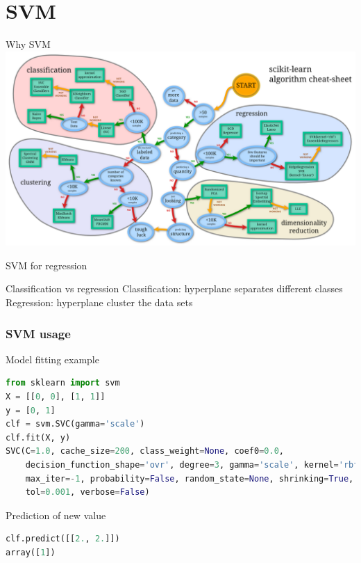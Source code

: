 \section{SVM}
\begin{frame}{Why SVM}
\centering
\includegraphics[height=0.8\textheight]{../figures/ml_cheatsheet.png}
\end{frame}

\begin{frame}{SVM for regression}
\begin{block}{Classification vs regression}
Classification: hyperplane separates different classes\\
Regression: hyperplane cluster the data sets
\end{block}
\end{frame}

\begin{frame}[fragile]
\frametitle{SVM usage}
\begin{block}{Model fitting example}
\begin{lstlisting}[language={python},frame=single]
from sklearn import svm
X = [[0, 0], [1, 1]]
y = [0, 1]
clf = svm.SVC(gamma='scale')
clf.fit(X, y)  
SVC(C=1.0, cache_size=200, class_weight=None, coef0=0.0,
    decision_function_shape='ovr', degree=3, gamma='scale', kernel='rbf',
    max_iter=-1, probability=False, random_state=None, shrinking=True,
    tol=0.001, verbose=False)
\end{lstlisting}
\end{block}
\begin{block}{Prediction of new value}
\begin{lstlisting}[language={python},frame=single]
clf.predict([[2., 2.]])
array([1])
\end{lstlisting}
\end{block}
\end{frame}

